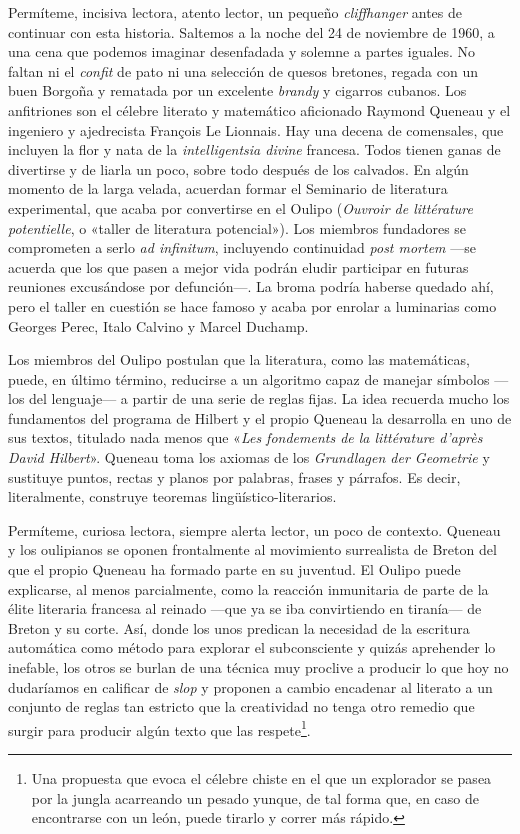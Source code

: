\documentclass[11pt,a4paper]{article}
\begin{document}
Permíteme, incisiva lectora, atento lector, un pequeño \emph{cliffhanger} antes de continuar con esta historia. Saltemos a la noche del 24 de noviembre de 1960, a una cena que podemos imaginar desenfadada y solemne a partes iguales. No faltan ni el \emph{confit} de pato ni una selección de quesos bretones, regada con un buen Borgoña y rematada por un excelente \emph{brandy} y cigarros cubanos. Los anfitriones son el célebre literato y matemático aficionado Raymond Queneau y el ingeniero y ajedrecista François Le Lionnais. Hay una decena de comensales, que incluyen la flor y nata de la \emph{intelligentsia divine} francesa. Todos tienen ganas de divertirse y de liarla un poco, sobre todo después de los calvados. En algún momento de la larga velada, acuerdan formar el Seminario de literatura experimental, que acaba por convertirse en el Oulipo (\emph{Ouvroir de littérature potentielle}, o «taller de literatura potencial»). Los miembros fundadores se comprometen a serlo \emph{ad infinitum}, incluyendo continuidad \emph{post mortem} ---se acuerda que los que pasen a mejor vida podrán eludir participar en futuras reuniones excusándose por defunción---. La broma podría haberse quedado ahí, pero el taller en cuestión se hace famoso y acaba por enrolar a luminarias como Georges Perec, Italo Calvino y Marcel Duchamp.

Los miembros del Oulipo postulan que la literatura, como las matemáticas, puede, en último término, reducirse a un algoritmo capaz de manejar símbolos ---los del lenguaje--- a partir de una serie de reglas fijas. La idea recuerda mucho los fundamentos del programa de Hilbert y el propio Queneau la desarrolla en uno de sus textos, titulado nada menos que «\emph{Les fondements de la littérature d'après David Hilbert}». Queneau toma los axiomas de los \emph{Grundlagen der Geometrie} y sustituye puntos, rectas y planos por palabras, frases y párrafos. Es decir, literalmente, construye teoremas lingüístico-literarios.

Permíteme, curiosa lectora, siempre alerta lector, un poco de contexto. Queneau y los oulipianos se oponen frontalmente al movimiento surrealista de Breton del que el propio Queneau ha formado parte en su juventud. El Oulipo puede explicarse, al menos parcialmente, como la reacción inmunitaria de parte de la élite literaria francesa al reinado ---que ya se iba convirtiendo en tiranía--- de Breton y su corte. Así, donde los unos predican la necesidad de la escritura automática como método para explorar el subconsciente y quizás aprehender lo inefable, los otros se burlan de una técnica muy proclive a producir lo que hoy no dudaríamos en calificar de \emph{slop} y proponen a cambio encadenar al literato a un conjunto de reglas tan estricto que la creatividad no tenga otro remedio que surgir para producir algún texto que las respete\footnote{Una propuesta que evoca el célebre chiste en el que un explorador se pasea por la jungla acarreando un pesado yunque, de tal forma que, en caso de encontrarse con un león, puede tirarlo y correr más rápido.}.
\end{document}

